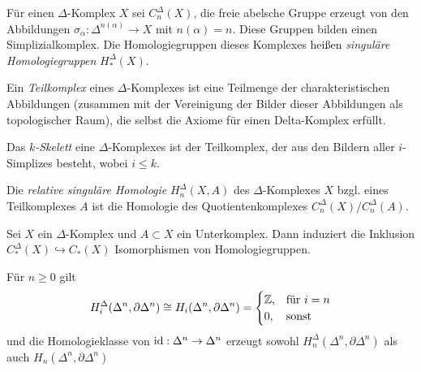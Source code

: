 \documentclass{cheat-sheet}
\begin{document}
\begin{defn}
  Für einen $\Delta$-Komplex $X$ sei $C_n^\Delta(X)$, die freie abelsche Gruppe erzeugt von den Abbildungen $\sigma_\alpha : \Delta^{n(\alpha)} \to X$ mit $n(\alpha) = n$. Diese Gruppen bilden einen Simplizialkomplex. Die Homologiegruppen dieses Komplexes heißen \emph{singuläre Homologiegruppen} $H^\Delta_*(X)$.
\end{defn}

\begin{defn}
  Ein \emph{Teilkomplex} eines $\Delta$-Komplexes ist eine Teilmenge der charakteristischen Abbildungen (zusammen mit der Vereinigung der Bilder dieser Abbildungen als topologischer Raum), die selbst die Axiome für einen Delta-Komplex erfüllt.
\end{defn}

\begin{defn}
  Das \emph{$k$-Skelett} eine $\Delta$-Komplexes ist der Teilkomplex, der aus den Bildern aller $i$-Simplizes besteht, wobei $i \leq k$.
\end{defn}

\begin{defn}
  Die \emph{relative singuläre Homologie} $H_n^\Delta(X, A)$ des $\Delta$-Komplexes $X$ bzgl. eines Teilkomplexes $A$ ist die Homologie des Quotientenkomplexes $C_n^\Delta(X)/C_n^\Delta(A)$.
\end{defn}

\begin{satz}
  Sei $X$ ein $\Delta$-Komplex und $A \subset X$ ein Unterkomplex. Dann induziert die Inklusion $C_*^\Delta(X) \hookrightarrow C_*(X)$ Isomorphismen von Homologiegruppen.
\end{satz}

\begin{lem}
  Für $n \geq 0$ gilt
  \[
    H^\Delta_i(\Delta^n, \partial \Delta^n) \cong
    H_i(\Delta^n, \partial \Delta^n) =
    \begin{cases}
      \mathbb{Z}, & \text{für $i=n$} \\
      0, & \text{sonst}
    \end{cases}
  \]
  und die Homologieklasse von $\mathrm{id} : \Delta^n \to \Delta^n$ erzeugt sowohl $H^\Delta_n(\Delta^n, \partial \Delta^n)$ als auch $H_n(\Delta^n, \partial \Delta^n)$
\end{lem}
\end{document}
